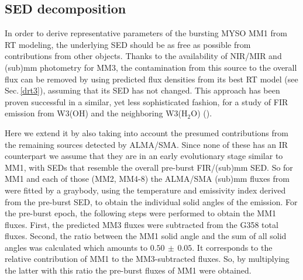 \subsection{SED decomposition}\label{sedc}

In order to derive representative parameters of the bursting MYSO MM1 from RT modeling, the underlying SED should be as free as possible from contributions from other objects. Thanks to the availability of NIR/MIR and (sub)mm photometry for MM3, the contamination from this source to the overall flux can be removed by using predicted flux densities from its best RT model (see Sec.\,\ref{drt3}), assuming that its SED has not changed. 
This approach has been proven successful in a similar, yet less sophisticated fashion, for a study of FIR emission from W3(OH) and the neighboring W3(H$_2$O) (\citealp{2002A&A...392.1025S}). 

Here we extend it by also taking into account the presumed contributions from the remaining sources detected by ALMA/SMA. Since none of these has an IR counterpart we assume that they are in an early evolutionary stage similar to MM1, with SEDs that resemble the overall pre-burst FIR/(sub)mm SED. So for MM1 and each of those (MM2, MM4-8) the ALMA/SMA (sub)mm fluxes from \citet{2019ApJ...881L..39B} were fitted by a graybody, using the temperature and emissivity index derived from the pre-burst SED, to obtain the individual solid angles of the emission. For the pre-burst epoch, the following steps were performed to obtain the MM1 fluxes. First, the predicted MM3 fluxes were subtracted from the G358 total fluxes. Second, the ratio between the MM1 solid angle and the sum of all solid angles was calculated which amounts to $0.50\,{\pm}\,0.05$. It corresponds to the relative contribution of MM1 to the MM3-subtracted fluxes. So, by multiplying the latter with this ratio the pre-burst fluxes of MM1 were obtained.

